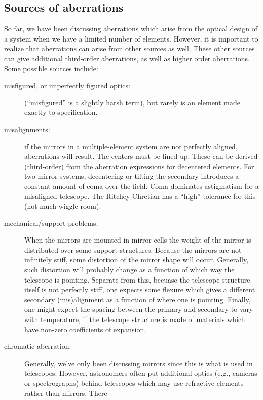 \documentclass[12pt]{article}
\newcommand{\mynotes}[1]{\textcolor{myBlue}{#1}}
\begin{document}
\subsection{Sources of aberrations}
So far, we have been discussing aberrations which arise from the optical design
of a system when we have a limited number of elements. However, it is important
to realize that aberrations can arise from other sources as well. These other
sources can give additional third-order aberrations, as well as higher order
aberrations. Some possible sources include:
\begin{description}
    \item [misfigured, or imperfectly figured optics:]
        \mynotes{(``misfigured'' is a slightly harsh term)}, but
        rarely is an element made exactly to specification.
    \item [misalignments:] if the mirrors in a multiple-element system are not
        perfectly aligned, aberrations will result. The centers must be lined
        up. These can be derived (third-order) from the aberration expressions
        for decentered elements. For two mirror systems, decentering or tilting
        the secondary introduces a constant amount of coma over the field. Coma
        dominates astigmatism for a misaligned telescope. The Ritchey-Chretian
        has a ``high'' tolerance for this (not much wiggle room).
    \item [mechanical/support problems:] When the mirrors are mounted in mirror
        cells the weight of the mirror is distributed over some support
        structures. Because the mirrors are not infinitely stiff, some
        distortion of the mirror shape will occur. Generally, such distortion
        will probably change as a function of which way the telescope is
        pointing. Separate from this, becuase the telescope structure itself is
        not perfectly stiff, one expects some flexure which gives a different
        secondary (mis)alignment as a function of where one is pointing.
        Finally, one might expect the spacing between the primary and secondary
        to vary with temperature, if the telescope structure is made of
        materials which have non-zero coefficients of expansion.
    \item [chromatic aberration:] Generally, we've only been discussing mirrors
        since this is what is used in telescopes. However, astronomers often
        put additional optics (e.g., cameras or spectrographs) behind
        telescopes which may use refractive elements rather than mirrors. There

\end{description}
\end{document}
